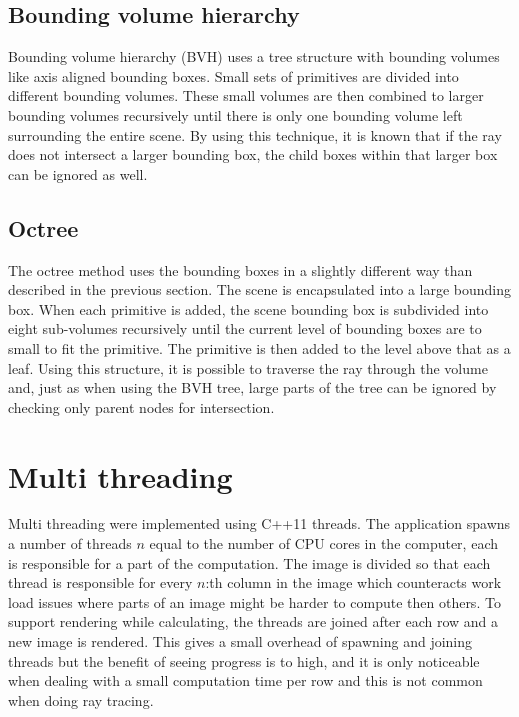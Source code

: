\documentclass[a4paper, 12pt]{report}
\begin{document}
\subsection{Bounding volume hierarchy}
Bounding volume hierarchy (BVH) uses a tree structure with bounding volumes like axis aligned bounding boxes. 
Small sets of primitives are divided into different bounding volumes.
These small volumes are then combined to larger bounding volumes recursively until there is only one bounding volume left surrounding the entire scene.
By using this technique, it is known that if the ray does not intersect a larger bounding box, the child boxes within that larger box can be ignored as well.

\subsection{Octree}
The octree method uses the bounding boxes in a slightly different way than described in the previous section.
The scene is encapsulated into a large bounding box.
When each primitive is added, the scene bounding box is subdivided into eight sub-volumes recursively until the current level of bounding boxes are to small to fit the primitive.
The primitive is then added to the level above that as a leaf.
Using this structure, it is possible to traverse the ray through the volume and, just as when using the BVH tree, large parts of the tree can be ignored by checking only parent nodes for intersection.

\section{Multi threading}
Multi threading were implemented using C++11 threads.
The application spawns a number of threads $ n $ equal to the number of CPU cores in the computer, each is responsible for a part of the computation.
The image is divided so that each thread is responsible for every $n$:th column in the image which counteracts work load issues where parts of an image might be harder to compute then others.
To support rendering while calculating, the threads are joined after each row and a new image is rendered.
This gives a small overhead of spawning and joining threads but the benefit of seeing progress is to high, and it is only noticeable when dealing with a small computation time per row and this is not common when doing ray tracing.
\end{document}
